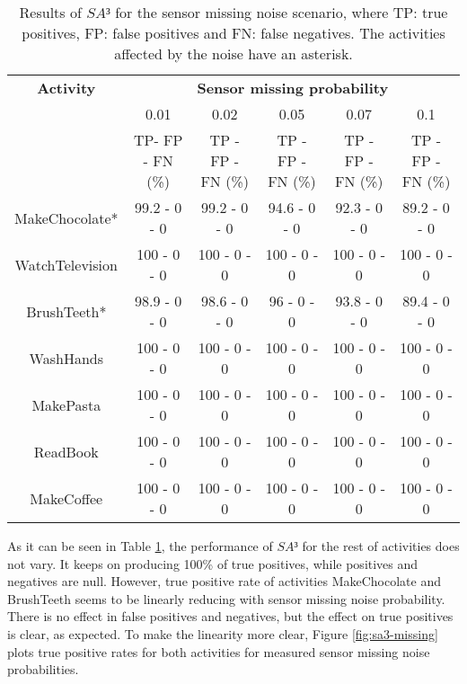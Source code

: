 \begin{table}[htbp]\scriptsize
  \begin{center}
        \begin{tabular}{cccccc}
            \hline            
            \textbf{Activity} & \multicolumn{5}{c}{\textbf{Sensor missing probability}}\\
             & 0.01 & 0.02 & 0.05 & 0.07 & 0.1 \\
             & TP- FP - FN (\%) & TP - FP - FN (\%) & TP - FP - FN (\%) & TP - FP - FN (\%) & TP - FP - FN (\%)\\
            \hline
            MakeChocolate*   & 99.2 - 0 - 0 & 99.2 - 0 - 0 & 94.6 - 0 - 0 & 92.3 - 0 - 0 & 89.2 - 0 - 0 \\
	    WatchTelevision  & 100 - 0 - 0 & 100 - 0 - 0 & 100 - 0 - 0 & 100 - 0 - 0 & 100 - 0 - 0 \\
	    BrushTeeth*      & 98.9 - 0 - 0 & 98.6 - 0 - 0 & 96 - 0 - 0 & 93.8 - 0 - 0 & 89.4 - 0 - 0 \\
	    WashHands        & 100 - 0 - 0 & 100 - 0 - 0 & 100 - 0 - 0 & 100 - 0 - 0 & 100 - 0 - 0 \\
	    MakePasta        & 100 - 0 - 0 & 100 - 0 - 0 & 100 - 0 - 0 & 100 - 0 - 0 & 100 - 0 - 0 \\
	    ReadBook         & 100 - 0 - 0 & 100 - 0 - 0 & 100 - 0 - 0 & 100 - 0 - 0 & 100 - 0 - 0 \\
	    MakeCoffee       & 100 - 0 - 0 & 100 - 0 - 0 & 100 - 0 - 0 & 100 - 0 - 0 & 100 - 0 - 0 \\
            \hline
        \end{tabular}                
        \caption{Results of $SA³$ for the sensor missing noise scenario, where TP: true positives, FP: false positives and FN: false negatives. The activities affected by the noise have an asterisk.}
        \label{tab-sa3-missing}
    \end{center}
\end{table}

As it can be seen in Table \ref{tab-sa3-missing}, the performance of $SA³$ for the rest of activities does not vary. It keeps on producing 100\% of true positives, while positives and negatives are null. However, true positive rate of activities MakeChocolate and BrushTeeth seems to be linearly reducing with sensor missing noise probability. There is no effect in false positives and negatives, but the effect on true positives is clear, as expected. To make the linearity more clear, Figure \ref{fig:sa3-missing} plots true positive rates for both activities for measured sensor missing noise probabilities. 

